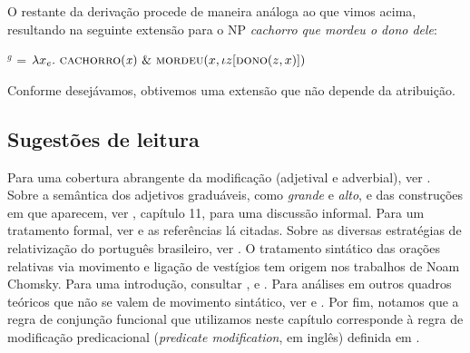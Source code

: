 \n O restante da derivação procede de maneira análoga ao que vimos
acima, resultando na seguinte extensão para o NP \textit{cachorro que mordeu o dono dele}:

\begin{exe}
	\ex {}$^{g}$ = $\lambda x_{e}.\ \predica{cachorro}{x}\ \&\ \textsc{mordeu}(x,\iota z[\textsc{dono}(z,x)])$
\end{exe}

\n Conforme desejávamos, obtivemos uma extensão que não depende da atribuição.

\bigskip

\begin{tcolorbox}[parbox=false,boxrule=0pt,sharp corners,breakable]

\section*{Sugestões de leitura}

\n Para uma cobertura abrangente da modificação (adjetival e adverbial), ver \cite{morzycki15}. Sobre a semântica dos adjetivos graduáveis, como \textit{grande} e \textit{alto}, e das construções em que aparecem, ver \cite{murphy10}, capítulo 11, para uma discussão informal. Para um tratamento formal, ver \cite{kennedy97} e as referências lá citadas. Sobre as diversas estratégias de relativização do português brasileiro, ver \cite{tarallo90}. O tratamento sintático das orações relativas via movimento e ligação de vestígios tem origem nos trabalhos de Noam Chomsky. Para uma introdução, consultar \cite{carnie13}, \cite{haegeman94} e \cite{mioal05}. Para análises em outros quadros teóricos que não se valem de movimento sintático, ver \cite{sagal03} e \cite{jacobson99}. Por fim, notamos que a regra de conjunção funcional que utilizamos neste capítulo corresponde à regra de modificação predicacional (\textit{predicate modification}, em inglês) definida em \cite{heikra98}. 

\end{tcolorbox}

\bigskip

